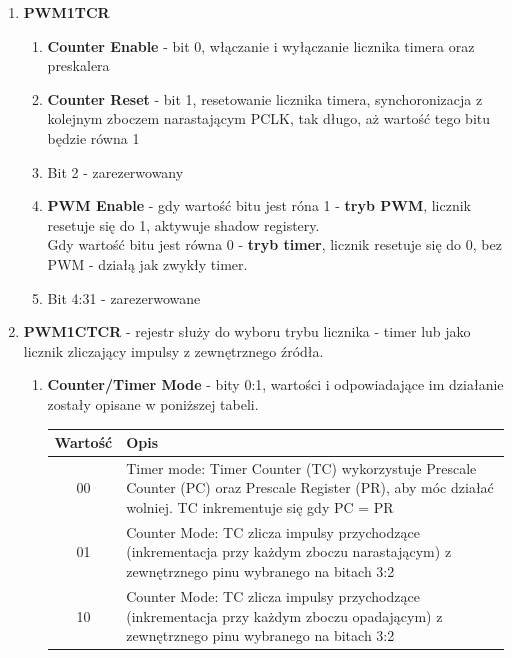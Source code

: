 \begin{enumerate}
\begin{enumerate}
\begin{enumerate}
        \end{enumerate}
        \item \textbf{PWM1TCR}
        \begin{enumerate}
            \item \textbf{Counter Enable} - bit 0, włączanie i wyłączanie licznika timera oraz preskalera
            \item \textbf{Counter Reset} - bit 1, resetowanie licznika timera, synchoronizacja z kolejnym zboczem narastającym PCLK, tak długo, aż wartość tego bitu będzie równa 1
            \item Bit 2 - zarezerwowany
            \item \textbf{PWM Enable} - gdy wartość bitu jest róna 1 - \textbf{tryb PWM}, licznik resetuje się do 1, aktywuje shadow registery.\\
                            Gdy wartość bitu jest równa 0 - \textbf{tryb timer}, licznik resetuje się do 0, bez PWM - działą jak zwykły timer.
            \item Bit 4:31 - zarezerwowane
        \end{enumerate}
        \item \textbf{PWM1CTCR} - rejestr służy do wyboru trybu licznika - timer lub jako licznik zliczający impulsy z zewnętrznego źródła. 
        \begin{enumerate}
            \item \textbf{Counter/Timer Mode} - bity 0:1, wartości i odpowiadające im działanie zostały opisane w poniższej tabeli.
            \begin{table}[H]
                \centering
                \begin{tabular}{|c|p{13cm}|}
                    \hline
                    \rowcolor{gray!30}
                    Wartość & Opis\\
                    \hline
                    00  & Timer mode: Timer Counter (TC) wykorzystuje Prescale Counter (PC) oraz Prescale Register (PR), aby móc działać wolniej. TC inkrementuje się gdy PC = PR\\
                    \hline
                    01 & Counter Mode: TC zlicza impulsy przychodzące (inkrementacja przy każdym zboczu narastającym) z zewnętrznego pinu wybranego na bitach 3:2  \\
                    \hline
                    10 & Counter Mode: TC zlicza impulsy przychodzące (inkrementacja przy każdym zboczu opadającym) z zewnętrznego pinu wybranego na bitach 3:2  \\

\end{tabular}
\end{table}
\end{enumerate}
\end{enumerate}
\end{enumerate}
